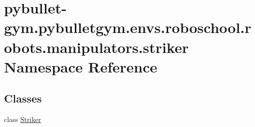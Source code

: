 \hypertarget{namespacepybullet-gym_1_1pybulletgym_1_1envs_1_1roboschool_1_1robots_1_1manipulators_1_1striker}{}\section{pybullet-\/gym.pybulletgym.\+envs.\+roboschool.\+robots.\+manipulators.\+striker Namespace Reference}
\label{namespacepybullet-gym_1_1pybulletgym_1_1envs_1_1roboschool_1_1robots_1_1manipulators_1_1striker}
\subsection*{Classes}
\begin{DoxyCompactItemize}
\item 
class \hyperlink{classpybullet-gym_1_1pybulletgym_1_1envs_1_1roboschool_1_1robots_1_1manipulators_1_1striker_1_1_striker}{Striker}
\end{DoxyCompactItemize}
